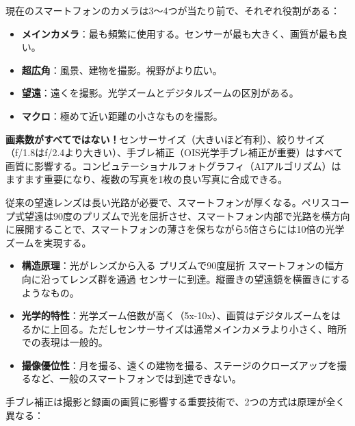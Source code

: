 
現在のスマートフォンのカメラは3〜4つが当たり前で、それぞれ役割がある：

\begin{itemize}
  \item \textbf{メインカメラ}：最も頻繁に使用する。センサーが最も大きく、画質が最も良い。
  \item \textbf{超広角}：風景、建物を撮影。視野がより広い。
  \item \textbf{望遠}：遠くを撮影。光学ズームとデジタルズームの区別がある。
  \item \textbf{マクロ}：極めて近い距離の小さなものを撮影。
\end{itemize}

\textbf{画素数がすべてではない！}センサーサイズ（大きいほど有利）、絞りサイズ（f/1.8はf/2.4より大きい）、手ブレ補正（OIS光学手ブレ補正が重要）はすべて画質に影響する。コンピュテーショナルフォトグラフィ（AIアルゴリズム）はますます重要になり、複数の写真を1枚の良い写真に合成できる。


従来の望遠レンズは長い光路が必要で、スマートフォンが厚くなる。ペリスコープ式望遠は90度のプリズムで光を屈折させ、スマートフォン内部で光路を横方向に展開することで、スマートフォンの薄さを保ちながら5倍さらには10倍の光学ズームを実現する。

\begin{itemize}
  \item \textbf{構造原理}：光がレンズから入る プリズムで90度屈折 スマートフォンの幅方向に沿ってレンズ群を通過 センサーに到達。縦置きの望遠鏡を横置きにするようなもの。
  \item \textbf{光学的特性}：光学ズーム倍数が高く（5x-10x）、画質はデジタルズームをはるかに上回る。ただしセンサーサイズは通常メインカメラより小さく、暗所での表現は一般的。
  \item \textbf{撮像優位性}：月を撮る、遠くの建物を撮る、ステージのクローズアップを撮るなど、一般のスマートフォンでは到達できない。
\end{itemize}


手ブレ補正は撮影と録画の画質に影響する重要技術で、2つの方式は原理が全く異なる：

